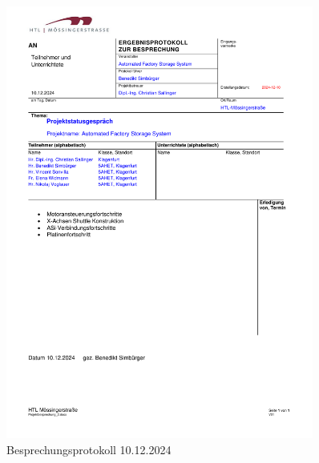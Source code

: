 \begin{figure}[H]
    \includegraphics[width=0.9\textwidth]{../Protokolls/Projektbesprechung_2.pdf}
    \centering
    \caption{Besprechungsprotokoll 10.12.2024}
\end{figure}

